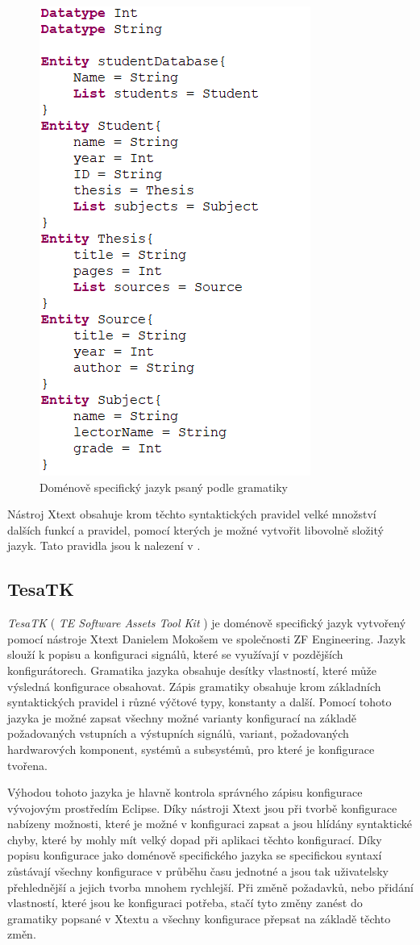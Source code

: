 \begin{figure}[H]
	\centering
	\includegraphics[width=0.5\linewidth]{images/xtext/tutorial_dsl}
	\caption{Doménově specifický jazyk psaný podle gramatiky}
\end{figure}

Nástroj Xtext obsahuje krom těchto syntaktických pravidel velké množství dalších funkcí a pravidel, pomocí kterých je možné vytvořit libovolně složitý jazyk. Tato pravidla jsou k nalezení v \cite{Xtext}.   

\subsection{TesaTK}

\textit{TesaTK} ( \textit{TE Software Assets Tool Kit} ) je doménově specifický jazyk vytvořený pomocí nástroje Xtext Danielem Mokošem ve společnosti ZF Engineering. Jazyk slouží k popisu a konfiguraci signálů, které se využívají v pozdějších konfigurátorech. Gramatika jazyka obsahuje desítky vlastností, které může výsledná konfigurace obsahovat. Zápis gramatiky obsahuje krom základních syntaktických pravidel i různé výčtové typy, konstanty a další. Pomocí tohoto jazyka je možné zapsat všechny možné varianty konfigurací na základě požadovaných vstupních a výstupních signálů, variant, požadovaných hardwarových komponent, systémů a subsystémů, pro které je konfigurace tvořena. 

Výhodou tohoto jazyka je hlavně kontrola správného zápisu konfigurace vývojovým prostředím Eclipse. Díky nástroji Xtext jsou při tvorbě konfigurace nabízeny možnosti, které je možné v konfiguraci zapsat a jsou hlídány syntaktické chyby, které by mohly mít velký dopad při aplikaci těchto konfigurací. Díky popisu konfigurace jako doménově specifického jazyka se specifickou syntaxí zůstávají všechny konfigurace v průběhu času jednotné a jsou tak uživatelsky přehlednější a jejich tvorba mnohem rychlejší. Při změně požadavků, nebo přidání vlastností, které jsou ke konfiguraci potřeba, stačí tyto změny zanést do gramatiky popsané v Xtextu a všechny konfigurace přepsat na základě těchto změn.

